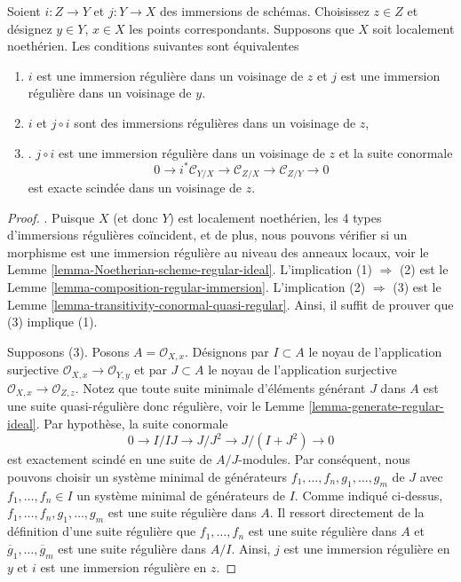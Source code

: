 \begin{lemma}
\label{lemma-extra-permanence-regular-immersion-noetherian}
Soient  $i : Z \to Y$  et  $j : Y \to X$  des immersions de schémas. Choisissez
 $z \in Z$  et désignez  $y \in Y$,  $x \in X$  les points correspondants.
Supposons que  $X$  soit localement noethérien. Les conditions suivantes
sont équivalentes
\begin{enumerate}
\item $i$  est une immersion régulière dans un voisinage de  $z$  et
 $j$  est une immersion régulière dans un voisinage de  $y$.
\item $i$  et  $j \circ i$  sont des immersions régulières dans un voisinage de
 $z$,
\item . $j \circ i$  est une immersion régulière dans un voisinage de  $z$  et la
suite conormale
$$
0 \to i^*\mathcal{C}_{Y/X} \to
\mathcal{C}_{Z/X} \to
\mathcal{C}_{Z/Y} \to 0
$$
est exacte scindée dans un voisinage de  $z$.
\end{enumerate}
\end{lemma}

\begin{proof}
. Puisque  $X$  (et donc  $Y$) est localement noethérien, les 4
types d’immersions régulières coïncident, et de plus, nous pouvons vérifier si un
morphisme est une immersion régulière au niveau des anneaux locaux, voir le Lemme
 \ref{lemma-Noetherian-scheme-regular-ideal}. L’implication (1)  $\Rightarrow$  (2) est le Lemme  \ref{lemma-composition-regular-immersion}.
L’implication (2)  $\Rightarrow$  (3) est le Lemme  \ref{lemma-transitivity-conormal-quasi-regular}. Ainsi, il suffit de
prouver que (3) implique (1).

\medskip\noindent
Supposons (3). Posons  $A = \mathcal{O}_{X, x}$. Désignons par  $I \subset A$  le noyau de
l'application surjective  $\mathcal{O}_{X, x} \to \mathcal{O}_{Y, y}$  et par  $J \subset A$  le noyau de
l'application surjective  $\mathcal{O}_{X, x} \to \mathcal{O}_{Z, z}$. Notez que toute suite minimale d'éléments
générant  $J$  dans  $A$  est une suite quasi-régulière donc
régulière, voir le Lemme  \ref{lemma-generate-regular-ideal}. Par hypothèse, la suite conormale
$$
0 \to I/IJ \to J/J^2 \to J/(I + J^2) \to 0
$$
est exactement scindé en une suite de  $A/J$-modules. Par conséquent, nous
pouvons choisir un système minimal de générateurs  $f_1, \ldots, f_n, g_1, \ldots, g_m$  de  $J$ 
avec  $f_1, \ldots, f_n \in I$  un système minimal de générateurs de  $I$. Comme indiqué
ci-dessus,  $f_1, \ldots, f_n, g_1, \ldots, g_m$  est une suite régulière dans  $A$. Il ressort
directement de la définition d'une suite régulière que  $f_1, \ldots, f_n$  est une suite
régulière dans  $A$  et  $\overline{g}_1, \ldots, \overline{g}_m$  est une suite régulière dans
 $A/I$. Ainsi,  $j$  est une immersion régulière en  $y$  et
 $i$  est une immersion régulière en  $z$.
\end{proof}

